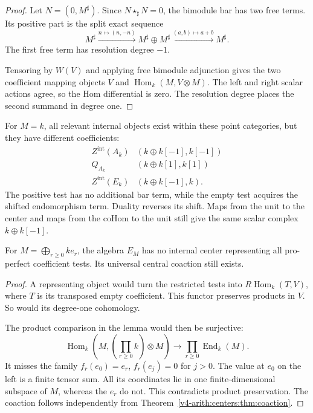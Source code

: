 \begin{proof}
Let $N=(0,M^\sharp)$. Since
$N\star_\sharp N=0$, the bimodule bar
has two free terms. Its positive part
is the split exact sequence
\[
 M^\sharp\xrightarrow{n\mapsto(n,-n)}
 M^\sharp\oplus M^\sharp
 \xrightarrow{(a,b)\mapsto a+b}M^\sharp.
\]
The first free term has resolution
degree $-1$.

Tensoring by $W(V)$ and
applying free bimodule adjunction
gives the two coefficient mapping
objects $V$ and
$\operatorname{Hom}_k(M,V\otimes M)$.
The left and right scalar actions
agree, so the Hom differential is
zero. The resolution degree places
the second summand in degree one.
\end{proof}

For $M=k$, all relevant internal
objects exist within these point
categories, but they have different
coefficients:
\[
\begin{array}{c|c}
 Z^{\mathrm{int}}(A_k)&(k\oplus k[-1],k[-1])\\
 Q_{A_k}&(k\oplus k[1],k[1])\\
 Z^{\mathrm{int}}(E_k)&(k\oplus k[-1],k).
\end{array}
\]
The positive test has no additional
bar term, while the empty test acquires
the shifted endomorphism term.
Duality reverses its shift. Maps from
the unit to the center and maps from
the coHom to the unit still give the
same scalar complex $k\oplus k[-1]$.

\begin{proposition}\label{v4-arith:centers:prop:point-obstruction}
For $M=\bigoplus_{r\geq0}ke_r$, the
algebra $E_M$ has no internal center
representing all pro-perfect
coefficient tests. Its universal
central coaction still exists.
\end{proposition}

\begin{proof}
A representing object would turn the
restricted tests into
$R\operatorname{Hom}_k(T,V)$, where
$T$ is its transposed empty coefficient.
This functor preserves products in
$V$. So would its degree-one
cohomology.

The product comparison in the lemma
would then be surjective:
\[
 \operatorname{Hom}_k
 \left(M,\left(\prod_{r\geq0}k\right)\otimes M\right)
 \longrightarrow
 \prod_{r\geq0}\operatorname{End}_k(M).
\]
It misses the family
$f_r(e_0)=e_r$, $f_r(e_j)=0$ for $j>0$.
The value at $e_0$ on the left is a
finite tensor sum. All its coordinates
lie in one finite-dimensional subspace
of $M$, whereas the $e_r$ do not.
This contradicts product preservation.
The coaction follows independently
from Theorem~\ref{v4-arith:centers:thm:coaction}.
\end{proof}

